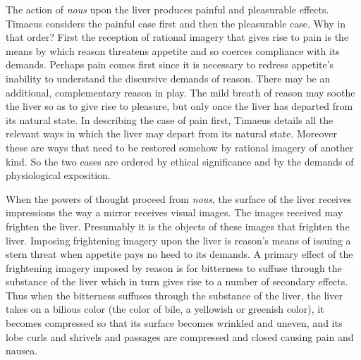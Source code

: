 The action of \emph{nous} upon the liver produces painful and pleasurable effects. Timaeus considers the painful case first and then the pleasurable case. Why in that order? First the reception of rational imagery that gives rise to pain is the means by which reason threatens appetite and so coerces compliance with its demands. Perhaps pain comes first since it is necessary to redress appetite's inability to understand the discursive demands of reason. There may be an additional, complementary reason in play. The mild breath of reason may soothe the liver so as to give rise to pleasure, but only once the liver has departed from its natural state. In describing the case of pain first, Timaeus details all the relevant ways in which the liver may depart from its natural state. Moreover these are ways that need to be restored somehow by rational imagery of another kind. So the two cases are ordered by ethical significance and by the demands of physiological exposition.

When the powers of thought proceed from \emph{nous}, the surface of the liver receives impressions the way a mirror receives visual images. The images received may frighten the liver. Presumably it is the objects of these images that frighten the liver. Imposing frightening imagery upon the liver is reason's means of issuing a stern threat when appetite pays no heed to its demands. A primary effect of the frightening imagery imposed by reason is for bitterness to suffuse through the substance of the liver which in turn gives rise to a number of secondary effects. Thus when the bitterness suffuses through the substance of the liver, the liver takes on a bilious color (the color of bile, a yellowish or greenish color), it becomes compressed so that its surface becomes wrinkled and uneven, and its lobe curls and shrivels and passages are compressed and closed causing pain and nausea.

